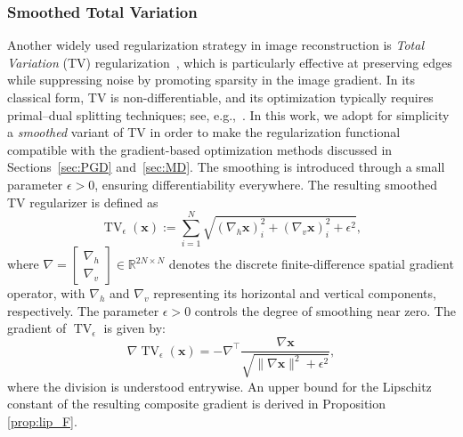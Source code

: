 \documentclass[letterpaper]{article}
\DeclareMathOperator*{\argmin}{arg\,min}
\begin{document}
\subsubsection{Smoothed Total Variation}
\label{sec:tv_reg}

Another widely used regularization strategy in image reconstruction is \emph{Total Variation} (TV) regularization~\cite{RUDIN1992259}, which is particularly effective at preserving edges while suppressing noise by promoting sparsity in the image gradient. In its classical form, TV is non-differentiable, and its optimization typically requires primal--dual splitting techniques; see, e.g.,~\cite{ChambollePock}.  In this work, we adopt for simplicity a \emph{smoothed} variant of TV in order to make the regularization functional compatible with the gradient-based optimization methods discussed in Sections~\ref{sec:PGD} and~\ref{sec:MD}. The smoothing is introduced through a small parameter $\epsilon > 0$, ensuring differentiability everywhere. The resulting smoothed TV regularizer is defined as
\begin{equation}
\label{eq:TV_smooth}
\operatorname{TV}_{\epsilon}(\mathbf{x})
:=
\sum_{i=1}^{N}
\sqrt{
\left(\nabla_h \mathbf{x}\right)_i^2
+
\left(\nabla_v \mathbf{x}\right)_i^2
+
\epsilon^2
},
\end{equation}
where
$
\nabla
=
\begin{bmatrix}
\nabla_h \\
\nabla_v
\end{bmatrix}
\in
\mathbb{R}^{2N\times N}
$
denotes the discrete finite-difference spatial gradient operator, with $\nabla_h$ and $\nabla_v$ representing its horizontal and vertical components, respectively. The parameter $\epsilon > 0$ controls the degree of smoothing near zero.
The gradient of $\operatorname{TV}_{\epsilon}$ is given by:
\begin{equation}
\label{eq:TV_grad}
    \nabla \operatorname{TV}_{\epsilon}(\mathbf{x}) 
    = -\nabla^{\top} \frac{\nabla \mathbf{x}}{\sqrt{\|\nabla \mathbf{x}\|^2 + \epsilon^2}},
\end{equation}
where the division is understood entrywise. An upper 
bound for the Lipschitz constant of the resulting composite gradient is derived in Proposition \ref{prop:lip_F}.
\end{document}

